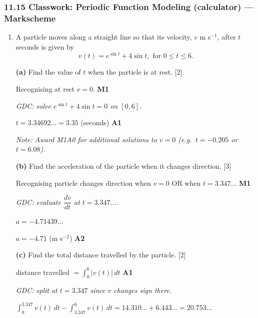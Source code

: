 \documentclass[12pt, twoside]{article}
\begin{document}
\subsubsection*{11.15 Classwork: Periodic Function Modeling (calculator) --- Markscheme}

\begin{enumerate}[itemsep=0.3cm]

\item[1.] [Maximum mark: 7]

A particle moves along a straight line so that its velocity, $v$ m s$^{-1}$, after $t$ seconds is given by
$$v(t) = e^{\sin t} + 4\sin t, \text{ for } 0 \le t \le 6.$$

\medskip

\textbf{(a)} Find the value of $t$ when the particle is at rest. \hfill [2]

\medskip

Recognising at rest $v = 0$. \hfill \textbf{M1}

\textit{GDC: solve $e^{\sin t} + 4 \sin t = 0$ on $[0, 6]$.}

$t = 3.34692\ldots = 3.35$ (seconds) \hfill \textbf{A1}

\textit{Note: Award M1A0 for additional solutions to $v = 0$ (e.g.\ $t = -0.205$ or $t = 6.08$).}

\medskip

\textbf{(b)} Find the acceleration of the particle when it changes direction. \hfill [3]

\medskip

Recognising particle changes direction when $v = 0$ OR when $t = 3.347\ldots$ \hfill \textbf{M1}

\textit{GDC: evaluate $\dfrac{dv}{dt}$ at $t = 3.347\ldots$.}

$a = -4.71439\ldots$

$a = -4.71$ (m s$^{-2}$) \hfill \textbf{A2}

\medskip

\textbf{(c)} Find the total distance travelled by the particle. \hfill [2]

\medskip

distance travelled $= \displaystyle\int_0^6 |v(t)|\,dt$ \hfill \textbf{A1}

\textit{GDC: split at $t = 3.347$ since $v$ changes sign there.}

$\displaystyle\int_0^{3.347} v(t)\,dt - \int_{3.347}^{6} v(t)\,dt = 14.310\ldots + 6.443\ldots = 20.753\ldots$


\end{enumerate}
\end{document}
